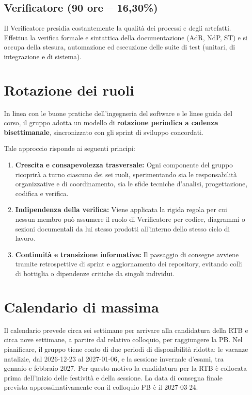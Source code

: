 \documentclass[a4paper, 11pt]{article}
\begin{document}
\subsection{Verificatore (90 ore -- 16,30\%)}
Il Verificatore presidia costantemente la qualità dei processi e degli artefatti. Effettua la verifica formale e sintattica della documentazione (AdR, NdP, ST) e si occupa della stesura, automazione ed esecuzione delle suite di test (unitari, di integrazione e di sistema).


\section{Rotazione dei ruoli}
In linea con le buone pratiche dell'ingegneria del software e le linee guida del corso, il gruppo adotta un modello di \textbf{rotazione periodica a cadenza bisettimanale}, sincronizzato con gli sprint di sviluppo concordati.
\newline

Tale approccio risponde ai seguenti principi:
\begin{enumerate}
    \item \textbf{Crescita e consapevolezza trasversale:} Ogni componente del gruppo ricoprirà a turno ciascuno dei sei ruoli, sperimentando sia le responsabilità organizzative e di coordinamento, sia le sfide tecniche d'analisi, progettazione, codifica e verifica.
    \item \textbf{Indipendenza della verifica:} Viene applicata la rigida regola per cui nessun membro può assumere il ruolo di Verificatore per codice, diagrammi o sezioni documentali da lui stesso prodotti all'interno dello stesso ciclo di lavoro.
    \item \textbf{Continuità e transizione informativa:} Il passaggio di consegne avviene tramite retrospettive di sprint e aggiornamento dei repository, evitando colli di bottiglia o dipendenze critiche da singoli individui.
\end{enumerate}

\vspace{0.4cm}

\section{Calendario di massima}

Il calendario prevede circa sei settimane per arrivare alla candidatura della RTB e circa nove settimane, a partire dal relativo colloquio, per raggiungere la PB. Nel pianificare, il gruppo tiene conto di due periodi di disponibilità ridotta: 
le vacanze natalizie, dal 2026-12-23 al 2027-01-06, e la sessione invernale d'esami, tra gennaio e febbraio 2027. 
Per questo motivo la candidatura per la RTB è collocata prima dell'inizio delle festività e della sessione. 
La data di consegna finale prevista approssimativamente con il colloquio PB è il 2027-03-24.
\end{document}
